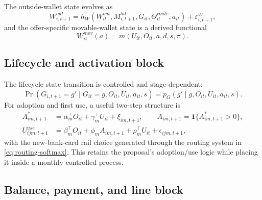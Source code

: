 \documentclass[11pt]{article}
\newcommand{\1}{\mathbf{1}}
\theoremstyle{definition}
\begin{document}
The outside-wallet state evolves as
\begin{equation}
  W^{out}_{i,t+1}
  =
  h_W(W^{out}_{it},M^{lat}_{i,t+1},G_{it},\Theta^{route}_{it},a_{it})
  + \varepsilon^W_{i,t+1},
  \label{eq:outside-wallet-transition}
\end{equation}
and the offer-specific movable-wallet state is a derived functional
\begin{equation}
  W^{mov}_{it}(a)
  =
  m(U_{it},O_{it},a,d,s,\pi).
  \label{eq:movable-wallet-functional}
\end{equation}

\subsection{Lifecycle and activation block}

The lifecycle state transition is controlled and stage-dependent:
\begin{equation}
  \Pr(G_{i,t+1}=g'\mid G_{it}=g,O_{it},U_{it},a_{it},s)
  = p_G(g'\mid g,O_{it},U_{it},a_{it},s).
  \label{eq:lifecycle-transition}
\end{equation}
For adoption and first use, a useful two-step structure is
\begin{align}
  A_{im,t+1}^{*}
    &= \alpha_m^{\top} O_{it} + \gamma_m^{\top} U_{it} + \xi_{im,t+1},
    \qquad
    A_{im,t+1}=\1\{A^*_{im,t+1}>0\},
    \label{eq:adoption-transition}\\
  U^{use}_{ijm,t+1}
    &= \beta_m^{\top} O_{it} + \phi_m A_{im,t+1} + \rho_m^{\top} U_{it}
       + \epsilon_{ijm,t+1},
    \label{eq:conditional-use-utility}
\end{align}
with the new-bank-card rail choice generated through the routing system in
\eqref{eq:routing-softmax}. This retains the proposal's adoption/use logic while
placing it inside a monthly controlled process.

\subsection{Balance, payment, and line block}
\end{document}
